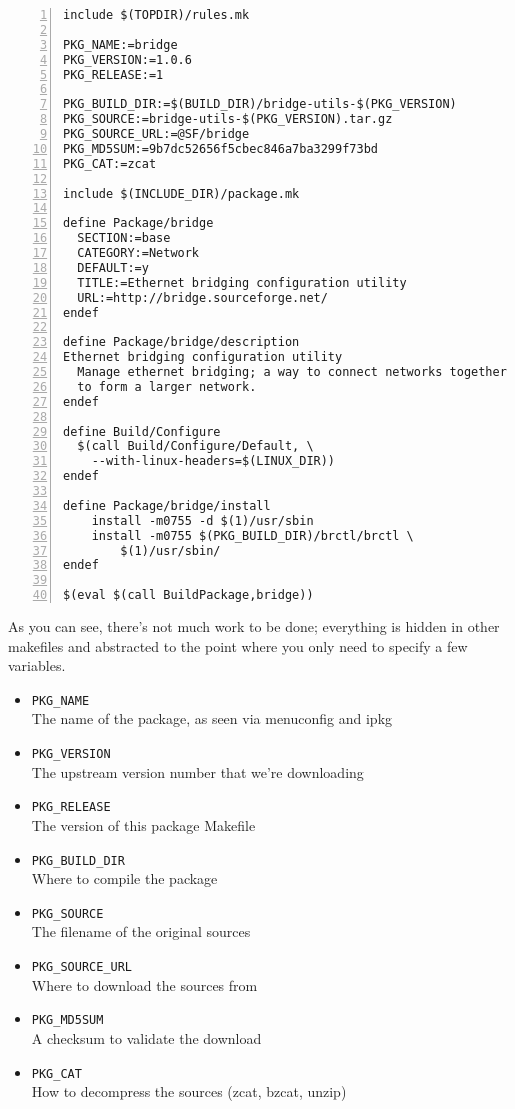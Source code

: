\begin{Verbatim}[frame=single,numbers=left]
include $(TOPDIR)/rules.mk

PKG_NAME:=bridge
PKG_VERSION:=1.0.6
PKG_RELEASE:=1

PKG_BUILD_DIR:=$(BUILD_DIR)/bridge-utils-$(PKG_VERSION)
PKG_SOURCE:=bridge-utils-$(PKG_VERSION).tar.gz
PKG_SOURCE_URL:=@SF/bridge
PKG_MD5SUM:=9b7dc52656f5cbec846a7ba3299f73bd
PKG_CAT:=zcat

include $(INCLUDE_DIR)/package.mk

define Package/bridge
  SECTION:=base
  CATEGORY:=Network
  DEFAULT:=y
  TITLE:=Ethernet bridging configuration utility
  URL:=http://bridge.sourceforge.net/
endef

define Package/bridge/description
Ethernet bridging configuration utility
  Manage ethernet bridging; a way to connect networks together
  to form a larger network.
endef

define Build/Configure
  $(call Build/Configure/Default, \
    --with-linux-headers=$(LINUX_DIR))
endef

define Package/bridge/install
	install -m0755 -d $(1)/usr/sbin
	install -m0755 $(PKG_BUILD_DIR)/brctl/brctl \
		$(1)/usr/sbin/
endef

$(eval $(call BuildPackage,bridge))
\end{Verbatim}


As you can see, there's not much work to be done; everything is hidden in other makefiles
and abstracted to the point where you only need to specify a few variables.

\begin{itemize}
	\item \texttt{PKG\_NAME} \\
		The name of the package, as seen via menuconfig and ipkg
	\item \texttt{PKG\_VERSION} \\
		The upstream version number that we're downloading
	\item \texttt{PKG\_RELEASE} \\
		The version of this package Makefile
	\item \texttt{PKG\_BUILD\_DIR} \\
		Where to compile the package
	\item \texttt{PKG\_SOURCE} \\
		The filename of the original sources
	\item \texttt{PKG\_SOURCE\_URL} \\
		Where to download the sources from
	\item \texttt{PKG\_MD5SUM} \\
		A checksum to validate the download
	\item \texttt{PKG\_CAT} \\
		How to decompress the sources (zcat, bzcat, unzip)
\end{itemize}

